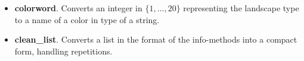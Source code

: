 \documentclass{article}
\begin{document}
\begin{itemize}
\begin{itemize}
			\item \textbf{info\_northern\_hemisphere}. converts information about stitch type and color of the northern hemisphere into one nested list. Differs from the result of the whole globe, because when crocheting the northern hemisphere alone, one starts from the north pole instead of the equator.
			\item \textbf{statistik}. Returns a dictionary, where each color is assigned to the amount of stitches in that color.
		\end{itemize}
		\item \textbf{colorword}. Converts an integer in \(\{1,\ldots,20\}\) representing the landscape type to a name of a color in type of a string.
		\item \textbf{clean\_list}. Converts a list in the format of the info-methods into a compact form, handling repetitions.
	\end{itemize}
	
	
\end{document}
